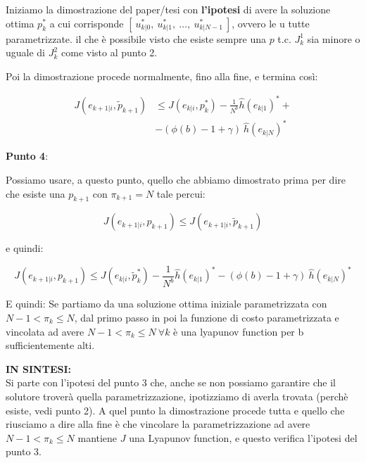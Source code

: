 \documentclass[12pt]{article}
\begin{document}
Iniziamo la dimostrazione del paper/tesi con \textbf{l'ipotesi} di avere la soluzione ottima $p_k^*$ a cui corrisponde $[\ u_{k|0}^*,\ u_{k|1}^*,\  \dots,\  u_{k|{N-1}}^*\ ]$, ovvero le u tutte parametrizzate. il che è possibile visto che esiste sempre una $p$ t.c. $J_k^1$ sia minore o uguale di $J_k^2$ come visto al punto 2. 

Poi la dimostrazione procede normalmente, fino alla fine, e termina così:

\begin{equation*}
    \begin{split}
        J({e}_{k+1|i},\tilde{p}_{k+1})&\le J({e}_{k|i},p_{k}^*) - \frac{1}{N^b}\hat{h}(e_{k|1})^*+ \\ 
            &-(\phi(b)-1+\gamma)\ \hat{h}(e_{k|N})^*
    \end{split}
\end{equation*}

\textbf{Punto 4}:

Possiamo usare, a questo punto, quello che abbiamo dimostrato prima per dire che esiste una $p_{k+1}$ con $\pi_{k+1} = N$ tale percui:

\begin{equation}
	J({e}_{k+1|i},p_{k+1}) \leq J({e}_{k+1|i},\tilde{p}_{k+1})
\end{equation}

e quindi: 

\begin{equation}
	J({e}_{k+1|i},p_{k+1}) \leq J({e}_{k|i},\tilde{p}_k^*)- \frac{1}{N^b}\hat{h}(e_{k|1})^*-(\phi(b)-1+\gamma)\ \hat{h}(e_{k|N})^*
\end{equation}

E quindi: 
Se partiamo da una soluzione ottima iniziale parametrizzata con $N-1 < \pi_k \leq N$, dal primo passo in poi la funzione di costo parametrizzata e vincolata ad avere $N-1 < \pi_k \leq N\  \forall k$ è una lyapunov function per b sufficientemente alti.

\textbf{IN SINTESI:}\\
Si parte con l'ipotesi del punto 3 che, anche se non possiamo garantire che il solutore troverà quella parametrizzazione, ipotizziamo di averla trovata (perchè esiste, vedi punto 2). A quel punto la dimostrazione procede tutta e quello che riusciamo a dire alla fine è che vincolare la parametrizzazione ad avere $N-1 < \pi_k \leq N$ mantiene $J$ una Lyapunov function, e questo verifica l'ipotesi del punto 3.
\end{document}
